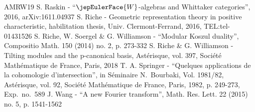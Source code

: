 \documentclass[10pt,a4paper]{amsart}
\theoremstyle{remark}
\numberwithin{equation}{section}
\DeclareRobustCommand{\jepPubBibliographyW}{\jepEulerFace{W}}
\begin{document}
\begin{thebibliography}{AMRW19}
 S. Raskin - “$\jepPubBibliographyW$-algebras and Whittaker categories”, 2016, arXiv:1611.04937
 S. Riche - Geometric representation theory in positive characteristic, habilitation thesis, Univ. Clermont-Ferrand, 2016, TEL:tel-01431526
 S. Riche, W. Soergel \& G. Williamson - “Modular Koszul duality”, Compositio Math. 150 (2014) no. 2, p. 273-332
 S. Riche \& G. Williamson - Tilting modules and the p-canonical basis, Astérisque, vol. 397, Société Mathématique de France, Paris, 2018
 T. A. Springer - “Quelques applications de la cohomologie d’intersection”, in Séminaire N. Bourbaki, Vol. 1981/82, Astérisque, vol. 92, Société Mathématique de France, Paris, 1982, p. 249-273, Exp. no. 589
 J. Wang - “A new Fourier transform”, Math. Res. Lett. 22 (2015) no. 5, p. 1541-1562
\end{thebibliography}
\end{document}
